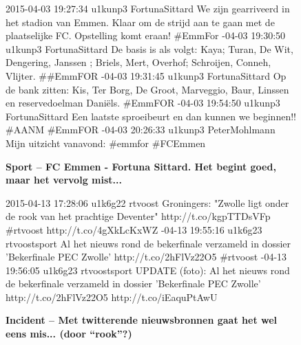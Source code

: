 {{\vspace*{-17pt} 
\begin{figure}[H]
 \caption{\bf{Sport} – FC Emmen - Fortuna Sittard. Het begint goed, maar het vervolg mist...}
\vspace*{-10pt} 
\begin{framed}
\footnotesize{
2015-04-03 19:27:34 u1kunp3 FortunaSittard We zijn gearriveerd in het stadion van Emmen. Klaar om de strijd aan te gaan met de plaatselijke FC. Opstelling komt eraan! \#EmmFor
-04-03 19:30:50 u1kunp3 FortunaSittard De basis is als volgt: Kaya; Turan, De Wit, Dengering, Janssen ; Briels, Mert, Overhof; Schroijen, Conneh, Vlijter. \#\#EmmFOR
-04-03 19:31:45 u1kunp3 FortunaSittard Op de bank zitten: Kis, Ter Borg, De Groot, Marveggio, Baur, Linssen en reservedoelman Daniëls. \#EmmFOR
-04-03 19:54:50 u1kunp3 FortunaSittard Een laatste sproeibeurt en dan kunnen we beginnen!! \#AANM \#EmmFOR
-04-03 20:26:33 u1kunp3 PeterMohlmann Mijn uitzicht vanavond: \#emmfor \#FCEmmen
}
\end{framed}
\end{figure}


\vspace*{-17pt} 
\begin{figure}[H]
 \caption{\bf{Incident} – Met twitterende nieuwsbronnen gaat het wel eens mis... (door ``rook''?)}
\vspace*{-10pt} 
\begin{framed}
\footnotesize{
2015-04-13 17:28:06 u1k6g22 rtvoost Groningers: "Zwolle ligt onder de rook van het prachtige Deventer" http://t.co/kgpTTDsVFp \#rtvoost http://t.co/4gXkLcKxWZ
-04-13 19:55:16 u1k6g23 rtvoostsport Al het nieuws rond de bekerfinale verzameld in dossier 'Bekerfinale PEC Zwolle' http://t.co/2hFlVz22O5 \#rtvoost
-04-13 19:56:05 u1k6g23 rtvoostsport UPDATE (foto): Al het nieuws rond de bekerfinale verzameld in dossier 'Bekerfinale PEC Zwolle' http://t.co/2hFlVz22O5 http://t.co/iEaquPtAwU
}
\end{framed}
\end{figure}

}}
